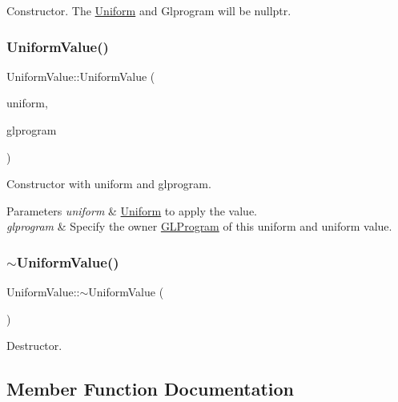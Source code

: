 Constructor. The \hyperlink{structUniform}{Uniform} and Glprogram will be nullptr. \mbox{\label{classUniformValue_a3abad7ce21beca7b12cd8c242b2129d5}} 
\subsubsection{\texorpdfstring{Uniform\+Value()}{UniformValue()}\hspace{0.1cm}{\footnotesize\ttfamily [4/4]}}
{\footnotesize\ttfamily Uniform\+Value\+::\+Uniform\+Value (\begin{DoxyParamCaption}\item[{\hyperlink{structUniform}{Uniform} $\ast$}]{uniform,  }\item[{\hyperlink{classGLProgram}{G\+L\+Program} $\ast$}]{glprogram }\end{DoxyParamCaption})}

Constructor with uniform and glprogram. 
\begin{DoxyParams}{Parameters}
{\em uniform} & \hyperlink{structUniform}{Uniform} to apply the value. \\
\hline
{\em glprogram} & Specify the owner \hyperlink{classGLProgram}{G\+L\+Program} of this uniform and uniform value. \\
\hline
\end{DoxyParams}
\mbox{\label{classUniformValue_a85225518894b909a58e7f53715de9419}} 
\subsubsection{\texorpdfstring{$\sim$\+Uniform\+Value()}{~UniformValue()}\hspace{0.1cm}{\footnotesize\ttfamily [2/2]}}
{\footnotesize\ttfamily Uniform\+Value\+::$\sim$\+Uniform\+Value (\begin{DoxyParamCaption}{ }\end{DoxyParamCaption})}

Destructor. 

\subsection{Member Function Documentation}
\mbox{\label{classUniformValue_a2e29cd1f5bd246b2296cb40a60c3adca}} 
